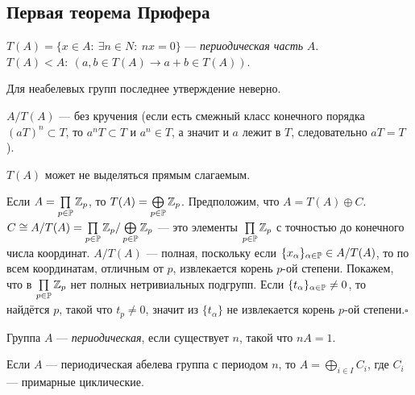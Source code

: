 \documentclass[10pt,a4paper,draft]{article}
\begin{document}
\subsection{Первая теорема Прюфера}

$T(A)=\{x\in A:~\exists n\in N:~nx=0\}$ --- {\em периодическая
часть} $A$. $T(A)<A:~(a,b\in
T(A)\rightarrow a+b\in T(A))$.

\begin{note}
Для неабелевых групп последнее утверждение неверно.
\end{note}

$A/T(A)$ --- без кручения (если есть смежный класс конечного
порядка $(aT)^n\subset T$, то $a^nT\subset T$ и $a^n\in T$, а
значит и $a$ лежит в $T$, следовательно $aT=T$).

\begin{ex}
$T(A)$ может не выделяться прямым слагаемым.

Если $A=\prod\limits_{p\in\mathbb P}\mathbb Z_p$, то
$T(A)=\bigoplus\limits_{p\in\mathbb P}\mathbb Z_p$. Предположим, что
$A=T(A)\oplus C$. $C\cong
A/T(A)=\prod\limits_{p\in\mathbb P}\mathbb Z_p/\bigoplus\limits_{p\in\mathbb P}\mathbb Z_p$
--- это элементы $\prod\limits_{p\in\mathbb P}\mathbb Z_p$ с точностью до
конечного числа координат. $A/T(A)$ --- полная, поскольку если
$\{x_\alpha\}_{\alpha\in\mathbb P}\in A/T(A)$, то по всем координатам,
отличным от $p$, извлекается корень $p$-ой степени. Покажем, что в
$\prod\limits_{p\in\mathbb P}\mathbb Z_p$ нет полных нетривиальных подгрупп.
Если $\{t_\alpha\}_{\alpha\in\mathbb P}\ne 0$, то найдётся $p$, такой
что $t_p\ne 0$, значит из $\{t_\alpha\}$ не извлекается корень
$p$-ой степени.$\square$
\end{ex}

Группа $A$ --- {\em периодическая},
если существует $n$, такой что $nA=1$.

\begin{theorem}Если $A$ --- периодическая абелева группа
с периодом $n$, то $A=\bigoplus\limits_{i\in I}C_i$, где $C_i$
--- примарные циклические.
\end{theorem}
\end{document}
